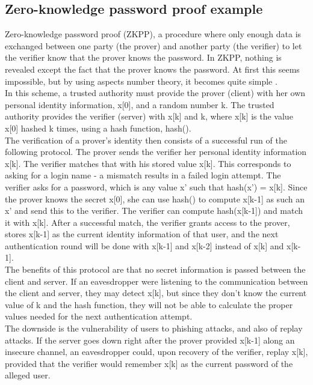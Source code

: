 \documentclass[11pt]{article}
\begin{document}
\subsection{Zero-knowledge password proof example} 
Zero-knowledge password proof (ZKPP)\cite{huth}, a procedure where only enough data is exchanged between one party (the prover) and another party (the verifier) to let the verifier know that the prover knows the password.  In ZKPP, nothing is revealed except the fact that the prover knows the password.  At first this seems impossible, but by using aspects number theory, it becomes quite simple \cite{gqprotocol}.\\
	In this scheme, a trusted authority must provide the prover (client) with her own personal identity information, x[0], and a random number k.  The trusted authority provides the verifier (server) with x[k] and k, where x[k] is the value x[0] hashed k times, using a hash function, hash().\\
	The verification of a prover's identity then consists of a successful run of the following protocol.  The prover sends the verifier her personal identity information x[k].  The verifier matches that with his stored value x[k].  This corresponds to asking for a login name - a mismatch results in a failed login attempt.  The verifier asks for a password, which is any value x' such that hash(x') = x[k]. Since the prover knows the secret x[0], she can use hash() to compute x[k-1] as such an x' and send this to the verifier.  The verifier can compute hash(x[k-1]) and match it with x[k].  After a successful match, the verifier grants access to the prover, stores x[k-1] as the current identity information of that user, and the next authentication round will be done with x[k-1] and x[k-2] instead of x[k] and x[k-1].\\
	The benefits of this protocol are that no secret information is passed between the client and server.  If an eavesdropper were listening to the communication between the client and server, they may detect x[k], but since they don't know the current value of k and the hash function, they will not be able to calculate the proper values needed for the next authentication attempt.\\
	The downside is the vulnerability of users to phishing attacks, and also of replay attacks.  If the server goes down right after the prover provided x[k-1] along an insecure channel, an eavesdropper could, upon recovery of the verifier, replay x[k], provided that the verifier would remember x[k] as the current password of the alleged user.\\
\end{document}
